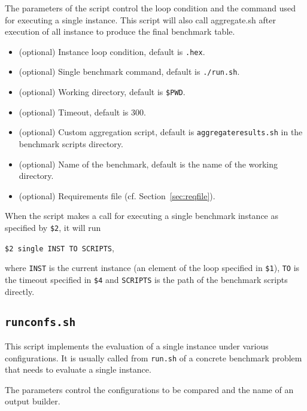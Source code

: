 \documentclass[a4paper]{article}
\begin{document}
		    The parameters of the script control the loop condition
		    and the command used for executing a single instance.
		    This script will also call aggregate.sh after execution of all instance
		    to produce the final benchmark table.
				
		    \medskip{}
		    \begin{itemize}
				\item[{\tt \$1}:] (optional) Instance loop condition, default is {\tt *.hex}.
				\item[{\tt \$2}:] (optional) Single benchmark command, default is {\tt ./run.sh}.
				\item[{\tt \$3}:] (optional) Working directory, default is {\tt \$PWD}.
				\item[{\tt \$4}:] (optional) Timeout, default is {\tt $300$}.
				\item[{\tt \$5}:] (optional) Custom aggregation script, default is {\tt aggregateresults.sh}
					in the benchmark scripts directory.
				\item[{\tt \$6}:] (optional) Name of the benchmark, default is the name of the working directory.
				\item[{\tt \$7}:] (optional) Requirements file (cf. Section~\ref{sec:reqfile}).
		    \end{itemize}
		 
		 	When the script makes a call for executing a single benchmark instance
		 	as specified by {\tt \$2}, it will run
		 	\begin{center}
		 		{\tt \$2 single INST TO SCRIPTS},
		 	\end{center}
		 	where {\tt INST} is the current instance (an element of the loop specified in {\tt \$1}),
		 	{\tt TO} is the timeout specified in {\tt \$4}
		 	and {\tt SCRIPTS} is the path of the benchmark scripts directly.
				
		\subsection{\tt runconfs.sh}
		\label{sec:architecture:runconfs}
		
		    This script implements the evaluation of
		    a single instance under various configurations.
		    It is usually called from {\tt run.sh} of a concrete benchmark problem
		    that needs to evaluate a single instance.
		
		    The parameters control the configurations to be compared
		    and the name of an output builder.
		
\end{document}
